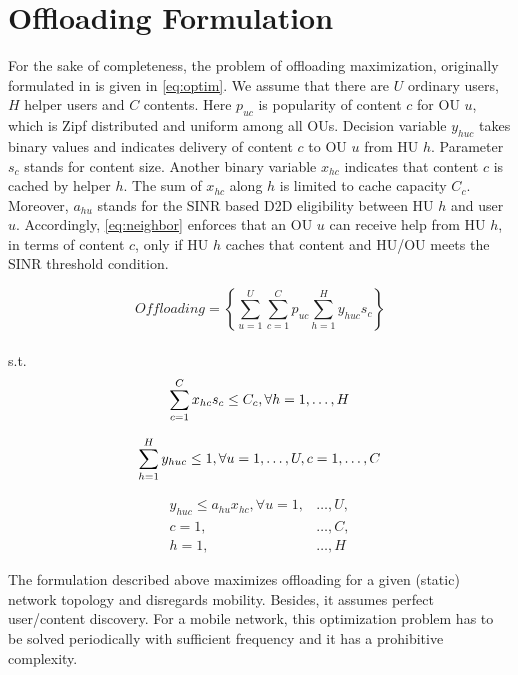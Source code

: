 \documentclass[10pt,a4paper,twocolumn]{article}
\begin{document}
\section{Offloading Formulation}
\label{sec:sec3}

For the sake of completeness, the problem of offloading maximization, originally formulated in \cite{Kazez2019Clustering} is given in \ref{eq:optim}. We assume that there are $U$ ordinary users, $H$ helper users and $C$ contents.  Here $p_{uc}$ is popularity of content $c$ for OU $u$, which is Zipf distributed and uniform among all OUs. Decision variable $y_{huc}$ takes binary values and indicates delivery of content $c$ to OU $u$ from HU $h$. Parameter $s_c$ stands for content size. Another binary variable $x_{hc}$ indicates that content $c$ is cached by helper $h$. The sum of $x_{hc}$ along $h$ is limited to cache capacity $C_c$. Moreover, $a_{hu}$ stands for the SINR based D2D eligibility between HU $h$ and user $u$. Accordingly, \ref{eq:neighbor} enforces that an OU $u$ can receive help from HU $h$, in terms of content $c$, only if HU $h$ caches that content and HU/OU meets the SINR threshold condition.

\begin{equation}\label{eq:optim}
	Offloading= \left\{\sum_{u=1}^{U}\sum_{c=1}^{C}p_{uc}\sum_{h=1}^{H}y_{huc}s_c\right\}
\end{equation}\\
s.t.
\begin{equation}
	\sum_{c=1}^{C} x_{hc}s_c \leq C_c , \forall h=1,\ldots,H \label{eq:cachecap}\\
\end{equation}

\begin{equation}
	\sum_{h=1}^{H}y_{huc} \leq 1, \forall u=1,\ldots,U, c=1,\ldots,C \label{eq:singlehelper} \\
\end{equation}

\begin{equation}
	\begin{aligned}
		y_{huc} \leq a_{hu}x_{hc}, \forall u=1, &\ldots, U,\\
		c=1,&\ldots,C,\\ 
		h=1,&\ldots,H \label{eq:neighbor}
	\end{aligned}
\end{equation}

The formulation described above maximizes offloading for a given (static) network topology and disregards mobility. Besides, it assumes perfect user/content discovery. For a mobile network, this optimization problem has to be solved periodically with sufficient frequency and it has a prohibitive complexity.
\end{document}
